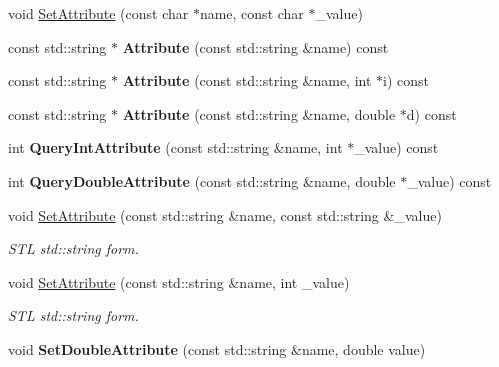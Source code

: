 \begin{DoxyCompactItemize}
\item 
void \hyperlink{class_ti_xml_element_abf0b3bd7f0e4c746a89ec6e7f101fc32}{Set\+Attribute} (const char $\ast$name, const char $\ast$\+\_\+value)
\item 
\hypertarget{class_ti_xml_element_a83b8b18d6ca253649ce378f8f5a2da49}{const std\+::string $\ast$ {\bfseries Attribute} (const std\+::string \&name) const }\label{class_ti_xml_element_a83b8b18d6ca253649ce378f8f5a2da49}

\item 
\hypertarget{class_ti_xml_element_aac36701ac5de73e9ef8c0b1d128e7782}{const std\+::string $\ast$ {\bfseries Attribute} (const std\+::string \&name, int $\ast$i) const }\label{class_ti_xml_element_aac36701ac5de73e9ef8c0b1d128e7782}

\item 
\hypertarget{class_ti_xml_element_a7131fe25a7e512f52ffa27518e108b7e}{const std\+::string $\ast$ {\bfseries Attribute} (const std\+::string \&name, double $\ast$d) const }\label{class_ti_xml_element_a7131fe25a7e512f52ffa27518e108b7e}

\item 
\hypertarget{class_ti_xml_element_ad79cb2416a5b94784f9a517add7e2d6d}{int {\bfseries Query\+Int\+Attribute} (const std\+::string \&name, int $\ast$\+\_\+value) const }\label{class_ti_xml_element_ad79cb2416a5b94784f9a517add7e2d6d}

\item 
\hypertarget{class_ti_xml_element_a157250e0c0303657d911f6991106ba73}{int {\bfseries Query\+Double\+Attribute} (const std\+::string \&name, double $\ast$\+\_\+value) const }\label{class_ti_xml_element_a157250e0c0303657d911f6991106ba73}

\item 
void \hyperlink{class_ti_xml_element_a80ed65b1d194c71c6c9986ae42337d7d}{Set\+Attribute} (const std\+::string \&name, const std\+::string \&\+\_\+value)
\begin{DoxyCompactList}\small\item\em S\+T\+L std\+::string form. \end{DoxyCompactList}\item 
\hypertarget{class_ti_xml_element_a6f18d54fbe25bbc527936ee65363b3c5}{void \hyperlink{class_ti_xml_element_a6f18d54fbe25bbc527936ee65363b3c5}{Set\+Attribute} (const std\+::string \&name, int \+\_\+value)}\label{class_ti_xml_element_a6f18d54fbe25bbc527936ee65363b3c5}

\begin{DoxyCompactList}\small\item\em S\+T\+L std\+::string form. \end{DoxyCompactList}\item 
\hypertarget{class_ti_xml_element_ac2112d423b39a93012b241f6baf4d3d3}{void {\bfseries Set\+Double\+Attribute} (const std\+::string \&name, double value)}\label{class_ti_xml_element_ac2112d423b39a93012b241f6baf4d3d3}


\end{DoxyCompactItemize}
